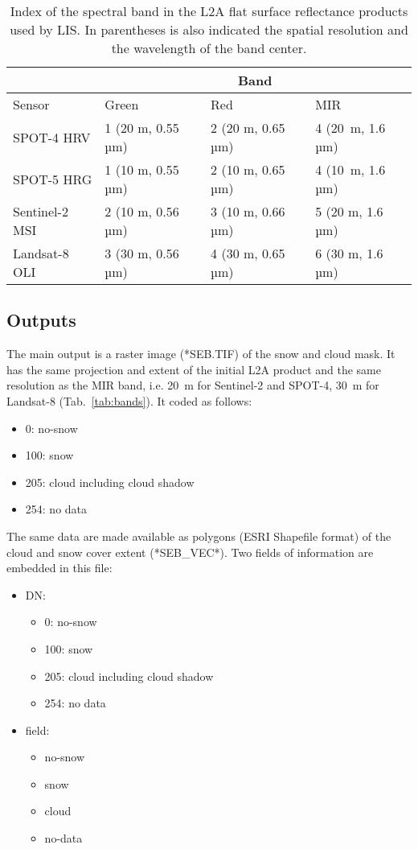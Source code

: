 \documentclass[a4paper]{article}
\begin{document}
\begin{table}[h]
\begin{center}
\begin{tabular}{|l|lll|}
\hline
  & \multicolumn{3}{|c|}{Band}\\
\hline
Sensor & Green & Red & MIR\\
\hline
SPOT-4 HRV & 1 (20 m, 0.55 µm) & 2 (20 m, 0.65 µm) & 4 (20~m, 1.6 µm)\\
SPOT-5 HRG & 1 (10 m, 0.55 µm) & 2 (10 m, 0.65 µm) & 4 (10~m, 1.6 µm)\\
Sentinel-2 MSI & 2 (10 m, 0.56 µm) & 3 (10 m, 0.66 µm) & 5 (20 m, 1.6 µm)\\
Landsat-8 OLI & 3 (30 m, 0.56 µm) & 4 (30 m, 0.65 µm) & 6 (30 m, 1.6 µm)\\
\hline
\end{tabular}
\end{center}
\caption{Index of the spectral band in the L2A flat surface reflectance products used by LIS. In parentheses is also indicated the spatial resolution and the wavelength of the band center.}
\end{table}\label{tab:bands}

\subsection{Outputs}\label{par:outputs}

The main output is a raster image (*SEB.TIF) of the snow and cloud mask. It has the same projection and extent of the initial L2A product and the same resolution as the MIR band, i.e. 20~m for Sentinel-2 and SPOT-4, 30~m for Landsat-8 (Tab.~\ref{tab:bands}). It coded as follows:
\begin{itemize}
 \item 0: no-snow
 \item 100: snow
 \item 205: cloud including cloud shadow
 \item 254: no data
\end{itemize}

The same data are made available as polygons (ESRI Shapefile format) of the cloud and snow cover extent (*SEB\_VEC*). Two fields of information are embedded in this file:
\begin{itemize}
  \item DN:
  \begin{itemize}
    \item 0: no-snow
    \item 100: snow
    \item 205: cloud including cloud shadow
    \item 254: no data
  \end{itemize}
  \item field:
  \begin{itemize}
    \item no-snow
    \item snow
    \item cloud
    \item no-data
  \end{itemize}
\end{itemize}
\end{document}
